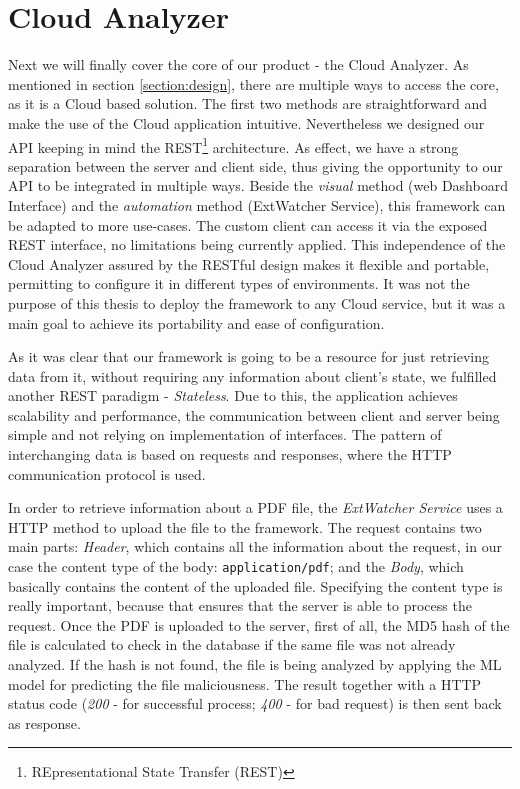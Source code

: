 \section{Cloud Analyzer}
\label{section:cloudApi}
Next we will finally cover the core of our product - the Cloud Analyzer. As mentioned in section \ref{section:design}, there are multiple ways to access the core, as it is a Cloud based solution. The first two methods are straightforward and make the use of the Cloud application intuitive. Nevertheless we designed our API keeping in mind the REST\footnote{REpresentational State Transfer (REST)} architecture. As effect, we have a strong separation between the server and client side, thus giving the opportunity to our API to be integrated in multiple ways. Beside the \textit{visual} method (web Dashboard Interface) and the \textit{automation} method (ExtWatcher Service), this framework can be adapted to more use-cases. The custom client can access it via the exposed REST interface, no limitations being currently applied. This independence of the Cloud Analyzer assured by the RESTful design makes it flexible and portable, permitting to configure it in different types of environments. It was not the purpose of this thesis to deploy the framework to any Cloud service, but it was a main goal to achieve its portability and ease of configuration. \par 
As it was clear that our framework is going to be a resource for just retrieving data from it, without requiring any information about client's state, we fulfilled another REST paradigm - \textit{Stateless}. Due to this, the application achieves scalability and performance, the communication between client and server being simple and not relying on implementation of interfaces. The pattern of interchanging data is based on requests and responses, where the HTTP communication protocol is used. \par
In order to retrieve information about a PDF file, the \textit{ExtWatcher Service} uses a  HTTP method to upload the file to the framework. The request contains two main parts: \textit{Header}, which contains all the information about the request, in our case the content type of the body: \texttt{application/pdf}; and the \textit{Body}, which basically contains the content of the uploaded file. Specifying the content type is really important, because that ensures that the server is able to process the request. Once the PDF is uploaded to the server, first of all, the MD5 hash of the file is calculated to check in the database if the same file was not already analyzed. If the hash is not found, the file is being analyzed by applying the ML model for predicting the file maliciousness. The result together with a HTTP status code (\textit{200} - for successful process; \textit{400} - for bad request) is then sent back as response. \par
